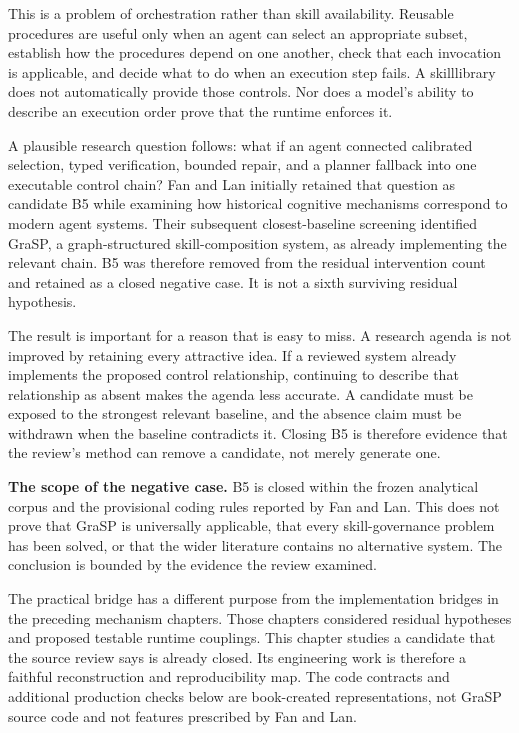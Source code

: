 This is a problem of orchestration rather than skill availability. Reusable procedures are useful only when an agent can select an appropriate subset, establish how the procedures depend on one another, check that each invocation is applicable, and decide what to do when an execution step fails. A \gls{skilllibrary} does not automatically provide those controls. Nor does a model's ability to describe an execution order prove that the runtime enforces it.

A plausible research question follows: what if an agent connected calibrated selection, typed verification, bounded repair, and a planner fallback into one executable control chain? Fan and Lan initially retained that question as candidate B5 while examining how historical cognitive mechanisms correspond to modern agent systems. Their subsequent closest-baseline screening identified GraSP, a graph-structured skill-composition system, as already implementing the relevant chain. B5 was therefore removed from the residual intervention count and retained as a closed negative case. It is not a sixth surviving residual hypothesis.

The result is important for a reason that is easy to miss. A research agenda is not improved by retaining every attractive idea. If a reviewed system already implements the proposed control relationship, continuing to describe that relationship as absent makes the agenda less accurate. A candidate must be exposed to the strongest relevant baseline, and the absence claim must be withdrawn when the baseline contradicts it. Closing B5 is therefore evidence that the review's method can remove a candidate, not merely generate one.

\begin{notebox}
\textbf{The scope of the negative case.} B5 is closed within the frozen analytical corpus and the provisional coding rules reported by Fan and Lan. This does not prove that GraSP is universally applicable, that every skill-governance problem has been solved, or that the wider literature contains no alternative system. The conclusion is bounded by the evidence the review examined.
\end{notebox}

The practical bridge has a different purpose from the implementation bridges in the preceding mechanism chapters. Those chapters considered residual hypotheses and proposed testable runtime couplings. This chapter studies a candidate that the source review says is already closed. Its engineering work is therefore a faithful reconstruction and reproducibility map. The code contracts and additional production checks below are book-created representations, not GraSP source code and not features prescribed by Fan and Lan.

